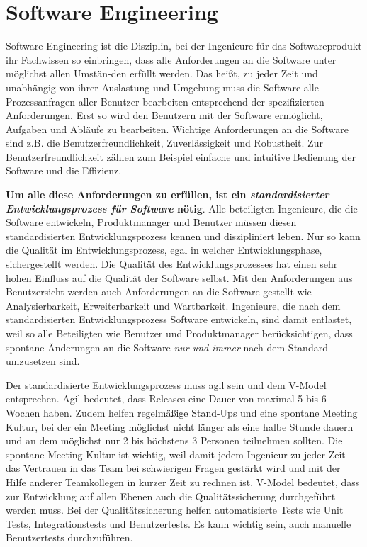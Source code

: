 \documentclass{scrarticle}
\numberwithin{equation}{section}
\begin{document}
\section{Software Engineering}
Software Engineering ist die Disziplin, bei der Ingenieure für das Softwareprodukt ihr Fachwissen so einbringen, dass alle Anforderungen an die Software unter möglichst allen Umstän-den erfüllt werden. Das heißt, zu jeder Zeit und unabhängig von ihrer Auslastung und Umgebung muss die Software alle Prozessanfragen aller Benutzer bearbeiten entsprechend der spezifizierten Anforderungen. Erst so wird den Benutzern mit der Software ermöglicht, Aufgaben und Abläufe zu bearbeiten. Wichtige Anforderungen an die Software sind z.B. die Benutzerfreundlichkeit, Zuverlässigkeit und Robustheit. Zur Benutzerfreundlichkeit zählen zum Beispiel einfache und intuitive Bedienung der Software und die Effizienz.

\textbf{Um alle diese Anforderungen zu erfüllen, ist ein \textit{standardisierter Entwicklungsprozess für Software} nötig}. Alle beteiligten Ingenieure, die die Software entwickeln, Produktmanager und Benutzer müssen diesen standardisierten Entwicklungsprozess kennen und diszipliniert leben. Nur so kann die Qualität im Entwicklungsprozess, egal in welcher Entwicklungsphase, sichergestellt werden. Die Qualität des Entwicklungsprozesses hat einen sehr hohen Einfluss auf die Qualität der Software selbst. Mit den Anforderungen aus Benutzersicht werden auch Anforderungen an die Software gestellt wie Analysierbarkeit, Erweiterbarkeit und Wartbarkeit. Ingenieure, die nach dem standardisierten Entwicklungsprozess Software entwickeln, sind damit entlastet, weil so alle Beteiligten wie Benutzer und Produktmanager berücksichtigen, dass spontane Änderungen an die Software \textit{nur und immer} nach dem Standard umzusetzen sind.

Der standardisierte Entwicklungsprozess muss agil sein und dem V-Model entsprechen. Agil bedeutet, dass Releases eine Dauer von maximal 5 bis 6 Wochen haben. Zudem helfen regelmäßige Stand-Ups und eine spontane Meeting Kultur, bei der ein Meeting möglichst nicht länger als eine halbe Stunde dauern und an dem möglichst nur 2 bis höchstens 3 Personen teilnehmen sollten. Die spontane Meeting Kultur ist wichtig, weil damit jedem Ingenieur zu jeder Zeit das Vertrauen in das Team bei schwierigen Fragen gestärkt wird und mit der Hilfe anderer Teamkollegen in kurzer Zeit zu rechnen ist. V-Model bedeutet, dass zur Entwicklung auf allen Ebenen auch die Qualitätssicherung durchgeführt werden muss. Bei der Qualitätssicherung helfen automatisierte Tests wie Unit Tests, Integrationstests und Benutzertests. Es kann wichtig sein, auch manuelle Benutzertests durchzuführen.
\end{document}

